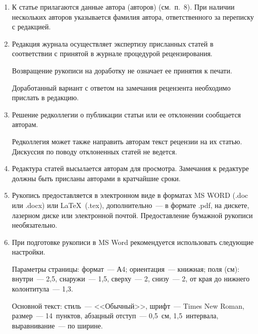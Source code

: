 {\begin{enumerate}[1.]
Редколлегия вправе запросить у авторов экспертное заключение о возможности
пуб\-ли\-ка\-ции пред\-став\-лен\-ной статьи в открытой печати.\\[-13.5pt]

\item К статье прилагаются данные автора (авторов) (см.\ п.~8). При наличии нескольких
авторов указывается фамилия автора, ответственного за переписку с редакцией.\\[-13.5pt]

\item Редакция журнала осуществляет экспертизу присланных статей в соответствии с
принятой в журнале процедурой рецензирования.

Возвращение рукописи на доработку не означает ее принятия к печати.

Доработанный вариант с ответом на замечания рецензента необходимо прислать в
редакцию.\\[-13.5pt]

\item Решение редколлегии о публикации статьи или ее отклонении сообщается авторам.

Редколлегия может также направить авторам текст рецензии на их статью. Дискуссия по
поводу отклоненных статей не ведется.\\[-13.5pt]


\item Редактура статей высылается авторам для просмотра. Замечания к редактуре должны
быть присланы авторами в кратчайшие сроки.\\[-13.5pt]

\item Рукопись предоставляется в электронном виде в форматах MS WORD (.doc или
.docx) или \LaTeX\  (.tex), дополнительно~--- в формате .pdf, на дискете, лазерном диске
или электронной почтой. Предоставление бумажной рукописи необязательно.\\[-13.5pt]

\item При подготовке рукописи в MS Word рекомендуется использовать следующие
настройки.

Параметры страницы:
формат~--- А4; ориентация~--- книжная; поля (см): внутри~--- 2,5, снаружи~--- 1,5,
сверху~--- 2, снизу~--- 2, от края до нижнего колонтитула~--- 1,3.

Основной текст: стиль~--- <<Обычный>>, шрифт~--- Times New Roman, размер~---
14~пунк\-тов, абзацный отступ~--- 0,5~см, 1,5~интервала, выравнивание~--- по ширине.


\end{enumerate}}

